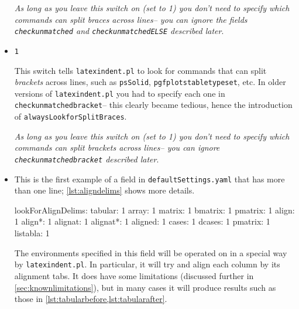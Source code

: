 \begin{itemize}
	\emph{As long as you leave this switch on (set to 1) you don't need to specify which 
		commands can split braces across lines-- you can ignore the 
		fields \lstinline!checkunmatched! and \lstinline!checkunmatchedELSE! described later}.
	\item[\verbitem{alwaysLookforSplitBrackets}] \lstinline!1!
														 		 		 		 		 					
	This switch tells \lstinline!latexindent.pl! to look for commands that 
	can split \emph{brackets} across lines, such as \lstinline!psSolid!, \lstinline!pgfplotstabletypeset!, 
	etc. In older versions of \lstinline!latexindent.pl! you had to specify each one in \lstinline!checkunmatchedbracket!-- 
	this clearly became tedious, hence the introduction of \lstinline!alwaysLookforSplitBraces!. 
														 		 		 		 		 					
	\emph{As long as you leave this switch on (set to 1) you don't need to specify which 
		commands can split brackets across lines-- you can ignore \lstinline!checkunmatchedbracket! described later}.
														 		 		 		 		 					
	\item[\verbitem{lookForAlignDelims}] This is the first example of a field
	in \lstinline!defaultSettings.yaml! that has more than one line; \cref{lst:aligndelims}
	shows more details.
														 		 		 		 		 					
	\begin{yaml}[caption={\lstinline!lookForAlignDelims!},label={lst:aligndelims}]
lookForAlignDelims:
   tabular: 1
   array: 1
   matrix: 1
   bmatrix: 1
   pmatrix: 1
   align: 1
   align*: 1
   alignat: 1
   alignat*: 1
   aligned: 1
   cases: 1
   dcases: 1
   pmatrix: 1
   listabla: 1
	\end{yaml}
														 		 		 		 		 					
	The environments specified in this field will be operated on in a special way  by \lstinline!latexindent.pl!. In particular, it will try and align each column by its alignment
	tabs. It does have some limitations (discussed further in \cref{sec:knownlimitations}), 
	but in many cases it will produce results such as those in \cref{lst:tabularbefore,lst:tabularafter}. 
														 		 		 		 		 					

\end{itemize}
